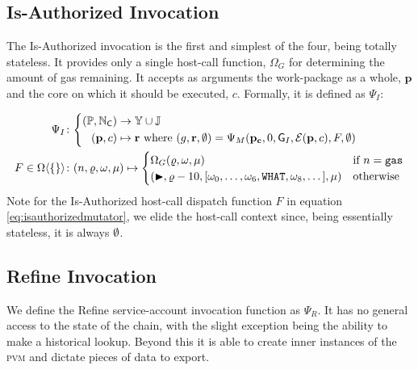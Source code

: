 \subsection{Is-Authorized Invocation}\label{sec:isauthorizedinvocation}

The Is-Authorized invocation is the first and simplest of the four, being totally stateless. It provides only a single host-call function, $\Omega_G$ for determining the amount of gas remaining. It accepts as arguments the work-package as a whole, $\mathbf{p}$ and the core on which it should be executed, $c$. Formally, it is defined as $\Psi_I$:


\begin{align}
  \Psi_I &\colon \left\{\begin{aligned}
    (\mathbb{P}, \N_\mathsf{C}) &\to \Y \cup \mathbb{J} \\
    (\mathbf{p}, c) &\mapsto \mathbf{r}\ \where (g, \mathbf{r}, \none) = \Psi_M(\mathbf{p}_\mathbf{c}, 0, \mathsf{G}_I, \mathcal{E}(\mathbf{p}, c), F, \none)
  \end{aligned}\right. \\
  \label{eq:isauthorizedmutator}F \in \Omega\ang{\{\}} &\colon
    (n, \gascounter, \registers, \memory) \mapsto \begin{cases}
      \Omega_G(\gascounter, \registers, \memory) &\when n = \mathtt{gas} \\
      (\continue, \gascounter - 10, [\registers_0, \dots, \registers_6, \mathtt{WHAT}, \registers_8, \dots], \memory) &\otherwise
    \end{cases}
\end{align}
Note for the Is-Authorized host-call dispatch function $F$ in equation \ref{eq:isauthorizedmutator}, we elide the host-call context since, being essentially stateless, it is always $\emptyset$.

\subsection{Refine Invocation}\label{sec:refineinvocation}

We define the Refine service-account invocation function as $\Psi_R$. It has no general access to the state of the \Jam chain, with the slight exception being the ability to make a historical lookup. Beyond this it is able to create inner instances of the \textsc{pvm} and dictate pieces of data to export.

